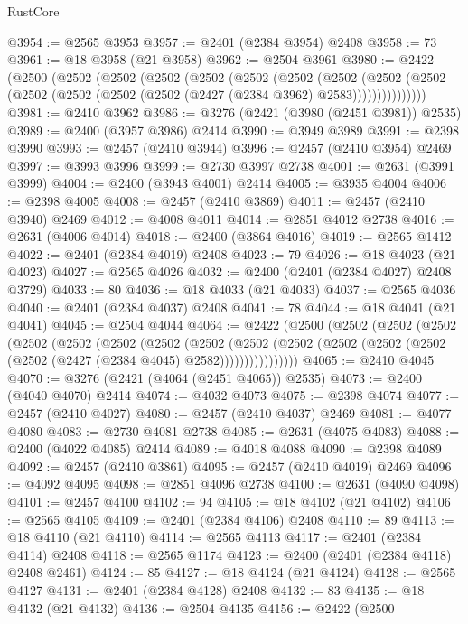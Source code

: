 \begin{lexlean}{RustCore}
\begin{coremodule}
@3954 := @2565 @3953
@3957 := @2401 (@2384 @3954) @2408
@3958 := 73
@3961 := @18 @3958 (@21 @3958)
@3962 := @2504 @3961
@3980 := @2422
    (@2500
      (@2502
        (@2502
          (@2502
            (@2502
              (@2502
                (@2502
                  (@2502
                    (@2502
                      (@2502 (@2502 (@2502 (@2502 (@2502 (@2427 (@2384 @3962) @2583)))))))))))))))
@3981 := @2410 @3962
@3986 := @3276 (@2421 (@3980 (@2451 @3981)) @2535)
@3989 := @2400 (@3957 @3986) @2414
@3990 := @3949 @3989
@3991 := @2398 @3990
@3993 := @2457 (@2410 @3944)
@3996 := @2457 (@2410 @3954) @2469
@3997 := @3993 @3996
@3999 := @2730 @3997 @2738
@4001 := @2631 (@3991 @3999)
@4004 := @2400 (@3943 @4001) @2414
@4005 := @3935 @4004
@4006 := @2398 @4005
@4008 := @2457 (@2410 @3869)
@4011 := @2457 (@2410 @3940) @2469
@4012 := @4008 @4011
@4014 := @2851 @4012 @2738
@4016 := @2631 (@4006 @4014)
@4018 := @2400 (@3864 @4016)
@4019 := @2565 @1412
@4022 := @2401 (@2384 @4019) @2408
@4023 := 79
@4026 := @18 @4023 (@21 @4023)
@4027 := @2565 @4026
@4032 := @2400 (@2401 (@2384 @4027) @2408 @3729)
@4033 := 80
@4036 := @18 @4033 (@21 @4033)
@4037 := @2565 @4036
@4040 := @2401 (@2384 @4037) @2408
@4041 := 78
@4044 := @18 @4041 (@21 @4041)
@4045 := @2504 @4044
@4064 := @2422
    (@2500
      (@2502
        (@2502
          (@2502
            (@2502
              (@2502
                (@2502
                  (@2502
                    (@2502
                      (@2502
                        (@2502
                          (@2502 (@2502 (@2502 (@2502 (@2427 (@2384 @4045) @2582))))))))))))))))
@4065 := @2410 @4045
@4070 := @3276 (@2421 (@4064 (@2451 @4065)) @2535)
@4073 := @2400 (@4040 @4070) @2414
@4074 := @4032 @4073
@4075 := @2398 @4074
@4077 := @2457 (@2410 @4027)
@4080 := @2457 (@2410 @4037) @2469
@4081 := @4077 @4080
@4083 := @2730 @4081 @2738
@4085 := @2631 (@4075 @4083)
@4088 := @2400 (@4022 @4085) @2414
@4089 := @4018 @4088
@4090 := @2398 @4089
@4092 := @2457 (@2410 @3861)
@4095 := @2457 (@2410 @4019) @2469
@4096 := @4092 @4095
@4098 := @2851 @4096 @2738
@4100 := @2631 (@4090 @4098)
@4101 := @2457 @4100
@4102 := 94
@4105 := @18 @4102 (@21 @4102)
@4106 := @2565 @4105
@4109 := @2401 (@2384 @4106) @2408
@4110 := 89
@4113 := @18 @4110 (@21 @4110)
@4114 := @2565 @4113
@4117 := @2401 (@2384 @4114) @2408
@4118 := @2565 @1174
@4123 := @2400 (@2401 (@2384 @4118) @2408 @2461)
@4124 := 85
@4127 := @18 @4124 (@21 @4124)
@4128 := @2565 @4127
@4131 := @2401 (@2384 @4128) @2408
@4132 := 83
@4135 := @18 @4132 (@21 @4132)
@4136 := @2504 @4135
@4156 := @2422
    (@2500

\end{coremodule}
\end{lexlean}
